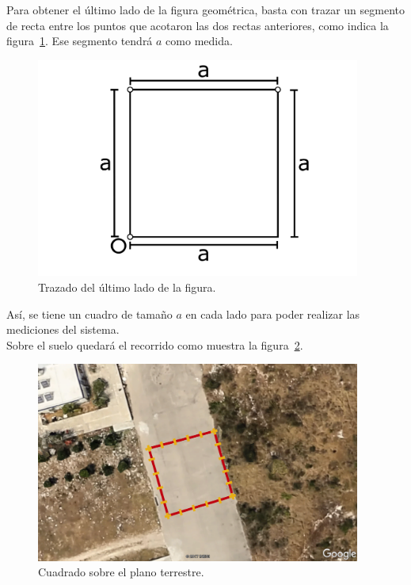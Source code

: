 Para obtener el último lado de la figura geométrica, basta con trazar un segmento de recta entre los puntos que acotaron las dos rectas anteriores, como indica la figura~\ref{fig:TrazFig10}. Ese segmento tendrá $a$ como medida.

\begin{figure}[H]
\centering
\includegraphics[width=0.95\textwidth]{Figures/Cuad10}
\caption[Trazado del último lado de la figura.]{Trazado del último lado de la figura.}
\label{fig:TrazFig10}
\end{figure}

Así, se tiene un cuadro de tamaño $a$ en cada lado para poder realizar las mediciones del sistema.\\

Sobre el suelo quedará el recorrido como muestra la figura~\ref{fig:Cuadr}.

\begin{figure}[H]
\centering
\includegraphics[width=0.95\textwidth]{Figures/FiguraFinal}
\caption[Cuadrado sobre el plano terrestre.]{Cuadrado sobre el plano terrestre.}
\label{fig:Cuadr}
\end{figure}

